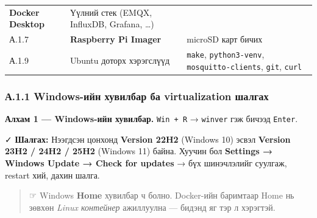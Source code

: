 \begin{longtable}[]{@{}lll@{}}
\begin{minipage}[t]{0.30\columnwidth}
\textbf{Docker Desktop}\strut
\end{minipage} & \begin{minipage}[t]{0.30\columnwidth}\raggedright
Үүлний стек (EMQX, InfluxDB, Grafana, \ldots)\strut
\end{minipage}\tabularnewline
\begin{minipage}[t]{0.30\columnwidth}\raggedright
А.1.7\strut
\end{minipage} & \begin{minipage}[t]{0.30\columnwidth}\raggedright
\textbf{Raspberry Pi Imager}\strut
\end{minipage} & \begin{minipage}[t]{0.30\columnwidth}\raggedright
microSD карт бичих\strut
\end{minipage}\tabularnewline
\begin{minipage}[t]{0.30\columnwidth}\raggedright
А.1.9\strut
\end{minipage} & \begin{minipage}[t]{0.30\columnwidth}\raggedright
Ubuntu доторх хэрэгслүүд\strut
\end{minipage} & \begin{minipage}[t]{0.30\columnwidth}\raggedright
\texttt{make}, \texttt{python3-venv}, \texttt{mosquitto-clients}, \texttt{git}, \texttt{curl}\strut
\end{minipage}\tabularnewline
\bottomrule
\end{longtable}\endgroup

\hypertarget{ux430.1.1-windows-ux438ux439ux43d-ux445ux443ux432ux438ux43bux431ux430ux440-ux431ux430-virtualization-ux448ux430ux43bux433ux430ux445}{%
\subsubsection{А.1.1 Windows-ийн хувилбар ба virtualization шалгах}\label{ux430.1.1-windows-ux438ux439ux43d-ux445ux443ux432ux438ux43bux431ux430ux440-ux431ux430-virtualization-ux448ux430ux43bux433ux430ux445}}

\textbf{Алхам 1 --- Windows-ийн хувилбар.} \texttt{Win\ +\ R} → \texttt{winver} гэж бичээд \texttt{Enter}.

✓ \textbf{Шалгах:} Нээгдсэн цонхонд \textbf{Version 22H2} (Windows 10) эсвэл \textbf{Version 23H2 / 24H2 / 25H2} (Windows 11) байна. Хуучин бол \textbf{Settings → Windows Update → Check for updates} → бүх шинэчлэлийг суулгаж, restart хий, дахин шалга.

\begin{quote}
☞ Windows \textbf{Home} хувилбар ч болно. Docker-ийн баримтаар Home нь зөвхөн \emph{Linux контейнер} ажиллуулна --- бидэнд яг тэр л хэрэгтэй.
\end{quote}

